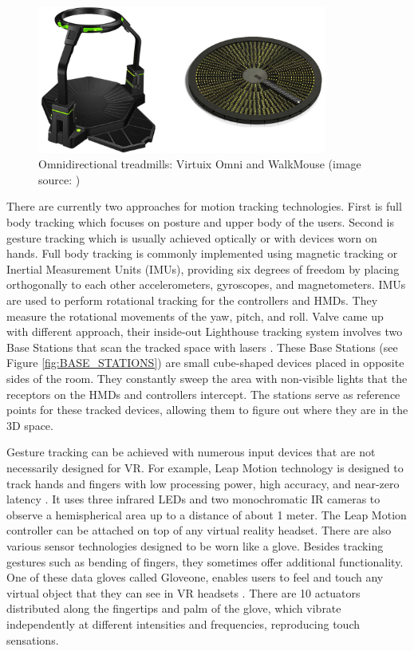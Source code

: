 \begin{figure}[th]
\centering
\includegraphics[width=0.85\textwidth]{img/vr_threadmills.png}
\caption{Omnidirectional treadmills: Virtuix Omni and WalkMouse (image source: \cite{VR_TECHNOLOGY})}
\label{fig:VIRTUX_IMAGE}
\end{figure}

There are currently two approaches for motion tracking technologies. First is full body tracking which focuses on posture and upper body of the users. Second is gesture tracking which is usually achieved optically or with devices worn on hands. Full body tracking is commonly implemented using magnetic tracking or Inertial Measurement Units (IMUs), providing six degrees of freedom by placing orthogonally to each other accelerometers, gyroscopes, and magnetometers. IMUs are used to perform rotational tracking for the controllers and HMDs. They measure the rotational movements of the yaw, pitch, and roll. Valve came up with different approach, their inside-out Lighthouse tracking system involves two Base Stations that scan the tracked space with lasers \cite{VIVE}. These Base Stations (see Figure \ref{fig:BASE_STATIONS}) are small cube-shaped devices placed in opposite sides of the room. They constantly sweep the area with non-visible lights that the receptors on the HMDs and controllers intercept. The stations serve as reference points for these tracked devices, allowing them to figure out where they are in the 3D space. 

Gesture tracking can be achieved with numerous input devices that are not necessarily designed for VR. For example, Leap Motion technology is designed to track hands and fingers with low processing power, high accuracy, and near-zero latency \cite{LEAP_MOTION}. It uses three infrared LEDs and two monochromatic IR cameras to observe a hemispherical area up to a distance of about 1 meter.  The Leap Motion controller can be attached on top of any virtual reality headset. There are also various sensor technologies designed to be worn like a glove. Besides tracking gestures such as bending of fingers, they sometimes offer additional functionality. One of these data gloves called Gloveone, enables users to feel and touch any virtual object that they can see in VR headsets \cite{GLOVEONE}. There are 10 actuators distributed along the fingertips and palm of the glove, which vibrate independently at different intensities and frequencies, reproducing touch sensations.

